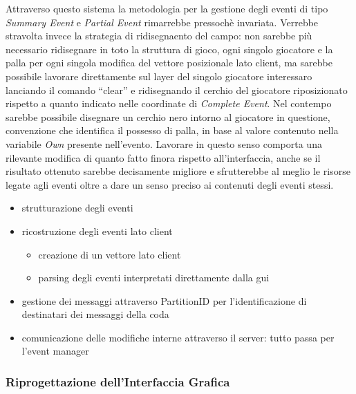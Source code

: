 \documentclass[aps,letterpaper,10pt]{article}
\begin{document}
Attraverso questo sistema la metodologia per la gestione degli eventi di tipo \emph{Summary Event} e \emph{Partial Event} rimarrebbe pressoch\`e invariata. Verrebbe stravolta invece la strategia di ridisegnaento del campo: non sarebbe più necessario ridisegnare in toto la struttura di gioco, ogni singolo giocatore e la palla per ogni singola modifica del vettore posizionale lato client, ma sarebbe possibile lavorare direttamente sul layer del singolo giocatore interessaro lanciando il comando ``clear'' e ridisegnando il cerchio del giocatore riposizionato rispetto a quanto indicato nelle coordinate di \emph{Complete Event}. Nel contempo sarebbe possibile disegnare un cerchio nero intorno al giocatore in questione, convenzione che identifica il possesso di palla, in base al valore contenuto nella variabile \emph{Own} presente nell'evento. Lavorare in questo senso comporta una rilevante modifica di quanto fatto finora rispetto all'interfaccia, anche se il risultato ottenuto sarebbe decisamente migliore e sfrutterebbe al meglio le risorse legate agli eventi oltre a dare un senso preciso ai contenuti degli eventi stessi.



\begin{itemize}

\item strutturazione degli eventi


\item ricostruzione degli eventi lato client

\begin{itemize}

\item creazione di un vettore lato client

\item parsing degli eventi interpretati direttamente dalla gui 

\end{itemize}

\item gestione dei messaggi attraverso PartitionID per l'identificazione di destinatari dei messaggi della coda

\item comunicazione delle modifiche interne attraverso il server: tutto passa per l'event manager



\end{itemize}

\subsubsection{Riprogettazione dell'Interfaccia Grafica} %
\label{ssub:riprogettazione_dell_interfaccia_grafica}
\end{document}

